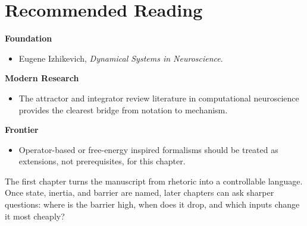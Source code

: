 \section{Recommended Reading}

\begin{readingbox}
\textbf{Foundation}
\begin{itemize}[nosep]
  \item Eugene Izhikevich, \emph{Dynamical Systems in Neuroscience}.
\end{itemize}
\textbf{Modern Research}
\begin{itemize}[nosep]
  \item The attractor and integrator review literature in computational
        neuroscience provides the clearest bridge from notation to mechanism.
\end{itemize}
\textbf{Frontier}
\begin{itemize}[nosep]
  \item Operator-based or free-energy inspired formalisms should be treated as
        extensions, not prerequisites, for this chapter.
\end{itemize}
\end{readingbox}

\begin{summarybox}
The first chapter turns the manuscript from rhetoric into a controllable
language. Once state, inertia, and barrier are named, later chapters can ask
sharper questions: where is the barrier high, when does it drop, and which
inputs change it most cheaply?
\end{summarybox}
